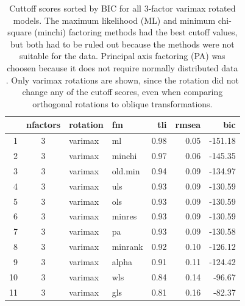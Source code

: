 \documentclass[020-persona\_validation.tex]{subfiles}
\begin{document}
        \begin{table}[ht]
            \centering
            \caption[Factoring methods for 3-factor model cutoffs]
            {Cuttoff scores sorted by BIC for all 3-factor varimax rotated models.
             The maximum likelihood (ML) and minimum chi-square (minchi) factoring methods
             had the best cutoff values,
             but both had to be ruled out because the methods were not suitable for the data.
             Principal axis factoring (PA) was choosen because it does not require normally distributed data
             \cite{arifinExploratoryFactorAnalysis2017, brownConfirmatoryFactorAnalysis2015}.
             Only varimax rotations are shown, since the rotation did not change any of the cutoff scores,
             even when comparing orthogonal rotations to oblique transformations.
            }
            \begin{tabular}{rcllrrr}
                \hline
                & nfactors & rotation & fm & tli & rmsea & bic \\
                \hline
                1 &   3 & varimax & ml & 0.98 & 0.05 & -151.18 \\
                2 &   3 & varimax & minchi & 0.97 & 0.06 & -145.35 \\
                3 &   3 & varimax & old.min & 0.94 & 0.09 & -134.97 \\
                4 &   3 & varimax & uls & 0.93 & 0.09 & -130.59 \\
                5 &   3 & varimax & ols & 0.93 & 0.09 & -130.59 \\
                6 &   3 & varimax & minres & 0.93 & 0.09 & -130.59 \\
                7 &   3 & varimax & pa & 0.93 & 0.09 & -130.58 \\
                8 &   3 & varimax & minrank & 0.92 & 0.10 & -126.12 \\
                9 &   3 & varimax & alpha & 0.91 & 0.11 & -124.42 \\
                10 &   3 & varimax & wls & 0.84 & 0.14 & -96.67 \\
                11 &   3 & varimax & gls & 0.81 & 0.16 & -82.37 \\
                \hline
            \end{tabular}
            \label{tab:all-good-3fa-varimax-models} %
        \end{table}
\end{document}
